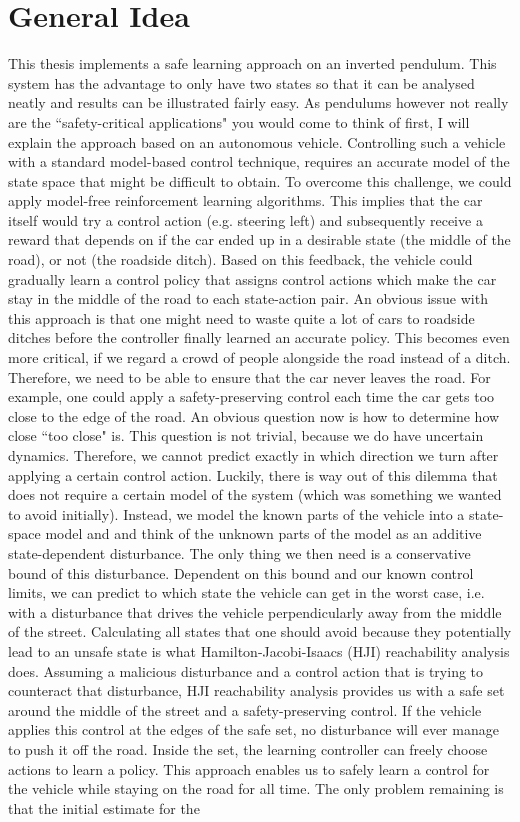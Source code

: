 \documentclass[../main.tex]{subfiles}
\begin{document}
\section{General Idea}
This thesis implements a safe learning approach on an inverted pendulum. This system has the advantage to only have two states so that it can be analysed neatly and results can be illustrated fairly easy. As pendulums however not really are the ``safety-critical applications" you would come to think of first, I will explain the approach based on an autonomous vehicle. 
Controlling such a vehicle with a standard model-based control technique, requires an accurate model of the state space that might be difficult to obtain.
To overcome this challenge, we could apply model-free reinforcement learning algorithms. This implies that the car itself would try a control action (e.g. steering left) and subsequently receive a reward that depends on if the car ended up in a desirable state (the middle of the road), or not (the roadside ditch). Based on this feedback, the vehicle could gradually learn a control policy that assigns control actions which make the car stay in the middle of the road to each state-action pair. An obvious issue with this approach is that one might need to waste quite a lot of cars to roadside ditches before the controller finally learned an accurate policy. This becomes even more critical, if we regard a crowd of people alongside the road instead of a ditch. Therefore, we need to be able to ensure that the car never leaves the road. For example, one could apply a safety-preserving control each time the car gets too close to the edge of the road. An obvious question now is how to determine how close ``too close" is. This question is not trivial, because we do have uncertain dynamics. Therefore, we cannot predict exactly in which direction we turn after applying a certain control action. Luckily, there is way out of this dilemma that does not require a certain model of the system (which was something we wanted to avoid initially). Instead, we model the known parts of the vehicle into a state-space model and and think of the unknown parts of the model as an additive state-dependent disturbance. The only thing we then need is a conservative bound of this disturbance. Dependent on this bound and our known control limits, we can predict to which state the vehicle can get in the worst case, i.e. with a disturbance that drives the vehicle perpendicularly away from the middle of the street. Calculating all states that one should avoid because they potentially lead to an unsafe state is what Hamilton-Jacobi-Isaacs (HJI) reachability analysis does. Assuming a malicious disturbance and a control action that is trying to counteract that disturbance, HJI reachability analysis provides us with a safe set around the middle of the street and a safety-preserving control. If the vehicle applies this control at the edges of the safe set, no disturbance will ever manage to push it off the road. Inside the set, the learning controller can freely choose actions to learn a policy. This approach enables us to safely learn a control for the vehicle while staying on the road for all time. The only problem remaining is that the initial estimate for the 
\end{document}
